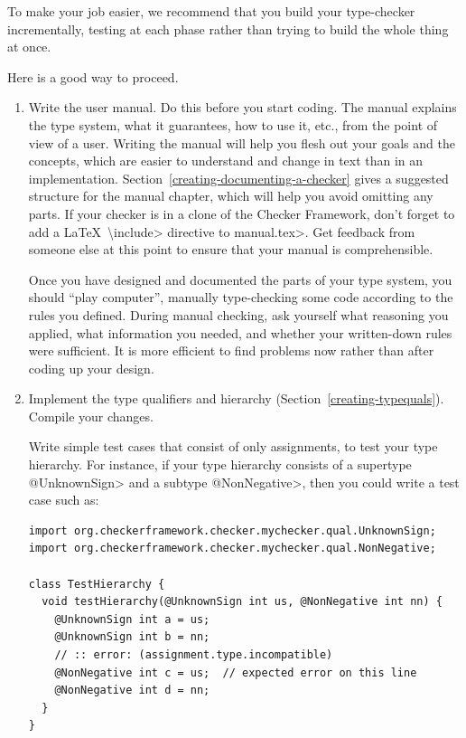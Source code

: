 
To make your job easier, we recommend that you build your type-checker
incrementally, testing at each phase rather than trying to build the whole
thing at once.

Here is a good way to proceed.

\begin{enumerate}
\item
\label{creating-tips-write-manual}
  Write the user manual.  Do this before you start coding.  The manual
  explains the type system, what it guarantees, how to use it, etc., from
  the point of view of a user.  Writing the manual will help you flesh out
  your goals and the concepts, which are easier to understand and change in
  text than in an implementation.
  Section~\ref{creating-documenting-a-checker} gives a suggested structure
  for the manual chapter, which will help you avoid omitting any parts.
  If your checker is in a clone of the Checker Framework, don't forget to
  add a \LaTeX\ \<\textbackslash{}include> directive to \<manual.tex>.
  Get feedback from someone else at this point to ensure that your manual
  is comprehensible.

  Once you have designed and documented the parts of your type system, you
  should ``play computer'', manually
  type-checking some code according to the rules you defined.
  During manual checking, ask
  yourself what reasoning you applied, what information you needed, and
  whether your written-down rules were sufficient.
  It is more efficient to find problems now rather than after coding up
  your design.

\item
\label{creating-tips-implement-qualifiers}
  Implement the type qualifiers and hierarchy
  (Section~\ref{creating-typequals}).
  Compile your changes.

  Write simple test cases that consist of only assignments,
  to test your type hierarchy.  For instance, if
  your type hierarchy consists of a supertype \<@UnknownSign> and a subtype
  \<@NonNegative>, then you could write a test case such as:

\begin{Verbatim}
import org.checkerframework.checker.mychecker.qual.UnknownSign;
import org.checkerframework.checker.mychecker.qual.NonNegative;

class TestHierarchy {
  void testHierarchy(@UnknownSign int us, @NonNegative int nn) {
    @UnknownSign int a = us;
    @UnknownSign int b = nn;
    // :: error: (assignment.type.incompatible)
    @NonNegative int c = us;  // expected error on this line
    @NonNegative int d = nn;
  }
}
\end{Verbatim}


\end{enumerate}
